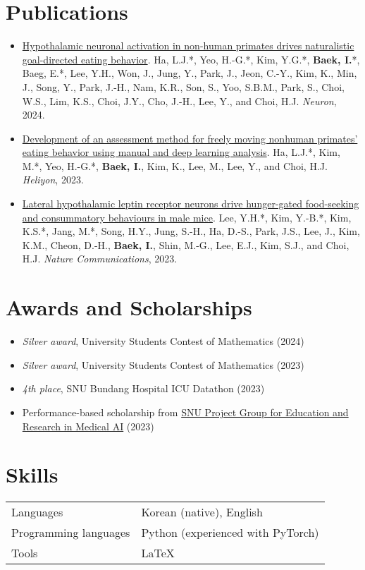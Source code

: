 \documentclass[10pt, a4paper]{article}
\newenvironment{customitemize}
	{\begin{itemize}[leftmargin=*, noitemsep, topsep=0pt, label=$\cdot$]}
	{\end{itemize}}
\begin{document}
\section*{Publications}
\begin{customitemize}
    \item \href{https://doi.org/10.1016/j.neuron.2024.03.029}{\color{mycolor} Hypothalamic neuronal activation in non-human primates drives naturalistic goal-directed eating behavior}. Ha, L.J.*, Yeo, H.-G.*, Kim, Y.G.*, \textbf{\color{mycolor} Baek, I.}*, Baeg, E.*, Lee, Y.H., Won, J., Jung, Y., Park, J., Jeon, C.-Y., Kim, K., Min, J., Song, Y., Park, J.-H., Nam, K.R., Son, S., Yoo, S.B.M., Park, S., Choi, W.S., Lim, K.S., Choi, J.Y., Cho, J.-H., Lee, Y., and Choi, H.J. \textit{Neuron}, 2024.
    
    \item \href{https://doi.org/10.1016/j.heliyon.2024.e25561}{\color{mycolor} Development of an assessment method for freely moving nonhuman primates' eating behavior using manual and deep learning analysis}. Ha, L.J.*, Kim, M.*, Yeo, H.-G.*, \textbf{\color{mycolor} Baek, I.}, Kim, K., Lee, M., Lee, Y., and Choi, H.J. \textit{Heliyon}, 2023.
    
    \item \href{https://doi.org/10.1038/s41467-023-37044-4}{\color{mycolor} Lateral hypothalamic leptin receptor neurons drive hunger-gated food-seeking and consummatory behaviours in male mice}. Lee, Y.H.*, Kim, Y.-B.*, Kim, K.S.*, Jang, M.*, Song, H.Y., Jung, S.-H., Ha, D.-S., Park, J.S., Lee, J., Kim, K.M., Cheon, D.-H., \textbf{\color{mycolor} Baek, I.}, Shin, M.-G., Lee, E.J., Kim, S.J., and Choi, H.J. \textit{Nature Communications}, 2023.
\end{customitemize}
\begin{flushright}
    \vspace{-10pt}{\footnotesize *: Equal contribution}
\end{flushright}

\section*{Awards and Scholarships}
\begin{customitemize}
    \item \textit{Silver award}, University Students Contest of Mathematics (2024)
    \item \textit{Silver award}, University Students Contest of Mathematics (2023)
    \item \textit{4th place}, SNU Bundang Hospital ICU Datathon (2023)
    \item Performance-based scholarship from \href{http://snuaimed.org/}{SNU Project Group for Education and Research in Medical AI} (2023)
\end{customitemize}

\section*{Skills}
\begin{tabular}{@{}ll@{}}
    Languages & Korean (native), English \\
    Programming languages & Python (experienced with PyTorch) \\
    Tools & \LaTeX
\end{tabular}
\end{document}
